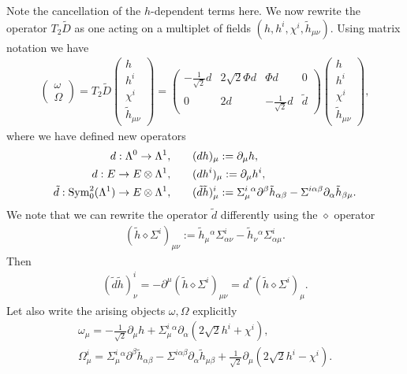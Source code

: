 \documentclass[10pt]{report}
\theoremstyle{definition}
\begin{document}
Note the cancellation of the $h$-dependent terms here. We now rewrite the operator $T_2 \tilde{D}$ as one acting on a multiplet of fields $(h,h^i,\chi^i,\tilde{h}_{\mu\nu})$. Using matrix notation we have
\begin{align}
\left( \begin{array}{c} \omega \\ \Omega\end{array}\right)=
T_2 \tilde{D} \left( \begin{array}{c} h \\ h^i \\ \chi^i \\ \tilde{h}_{\mu\nu}\end{array}\right) = \left(\begin{array}{cccc} - \frac{1}{\sqrt{2}} d & 2\sqrt{2} \Phi d & \Phi d & 0 \\
0 & 2 d & - \frac{1}{\sqrt{2}} d & \tilde{d} \end{array}\right) \left( \begin{array}{c} h \\ h^i \\ \chi^i \\ \tilde{h}_{\mu\nu}\end{array}\right),
\end{align}
where we have defined new operators 
\begin{align}
d:\Lambda^0\to \Lambda^1, \qquad & (dh)_\mu := \partial_\mu h, \\ \nonumber
d: E\to E\otimes \Lambda^1, \qquad & (dh^i)_\mu := \partial_\mu h^i, \\ \nonumber
\tilde{d}:{\rm Sym}^2_0(\Lambda^1)\to E\otimes \Lambda^1, \qquad & (\tilde{d}\tilde{h})_\mu^i := \Sigma^{i}_\mu{}^\alpha \partial^\beta \tilde{h}_{\alpha\beta}- \Sigma^{i\alpha\beta} \partial_\alpha \tilde{h}_{\beta\mu}.
\end{align}
We note that we can rewrite the operator $\tilde{d}$ differently using the $\diamond$ operator
\begin{align}
(\tilde{h}\diamond \Sigma^i)_{\mu\nu}:= \tilde{h}_\mu{}^\alpha \Sigma^i_{\alpha\nu} -  \tilde{h}_\nu{}^\alpha \Sigma^i_{\alpha\mu}.
\end{align}
Then
\begin{align}
 (\tilde{d}\tilde{h})_\nu^i = - \partial^\mu (\tilde{h}\diamond \Sigma^i)_{\mu\nu} = d^* (\tilde{h} \diamond \Sigma^i)_\mu.
 \end{align}
Let also write the arising objects $\omega,\Omega$ explicitly
\begin{align}
\omega_\mu = - \frac{1}{\sqrt{2}} \partial_\mu h  + \Sigma^i_\mu{}^\alpha \partial_\alpha ( 2\sqrt{2} h^i + \chi^i), \\ \nonumber
\Omega_\mu^i =\Sigma^i_\mu{}^\alpha\partial^\beta \tilde{h}_{\alpha\beta} -  \Sigma^{i\alpha\beta} \partial_\alpha \tilde{h}_{\mu\beta} + \frac{1}{\sqrt{2}} \partial_\mu (2 \sqrt{2} h^i - \chi^i).
\end{align}
\end{document}
